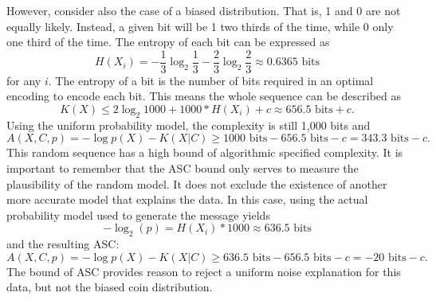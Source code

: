However, consider also the case of a biased distribution.
That is, 1 and 0 are not equally likely.
Instead, a given bit will be 1 two thirds of the time, while 0 only one third of the time.
The entropy of each bit can be expressed as
\begin{equation}
    H(X_i) = - \frac{1}{3} \log_2 \frac{1}{3} - \frac{2}{3} \log_2 \frac{2}{3} \approx 0.6365 \mbox{ bits}
\end{equation} for any $i$.
The entropy of a bit is the number of bits required in an optimal encoding to encode each bit.
This means the whole sequence can be described as
\begin{equation}
    K(X) \leq 2 \log_2 1000 + 1000*H(X_i) + c \approx 656.5 \mbox{ bits} +c \mbox{.}
\end{equation}
Using the uniform probability model, the complexity is still 1,000 bits and
\begin{equation}
    A(X,C,p) = - \log p(X) - K(X|C) \geq 1000 \mbox{ bits} - 656.5 \mbox{ bits} - c = 343.3 \mbox{ bits} -c \mbox{.}
\end{equation}
This random sequence has a high bound of algorithmic specified complexity.
It is important to remember that the ASC bound only serves to measure the plausibility of the random model.
It does not exclude the existence of another more accurate model that explains the data.
In this case, using the actual probability model used to generate the message yields
\begin{equation}
    -\log_2(p) = H(X_i) * 1000 \approx 636.5 \mbox{ bits}
\end{equation}
and the resulting ASC:
\begin{equation}
    A(X,C,p) = - \log p(X) - K(X|C) \geq 636.5 \mbox{ bits} - 656.5 \mbox{ bits} - c = -20 \mbox{ bits} -c \mbox{.}
\end{equation}
The bound of ASC provides reason to reject a uniform noise explanation for this data, but not the biased coin distribution.

